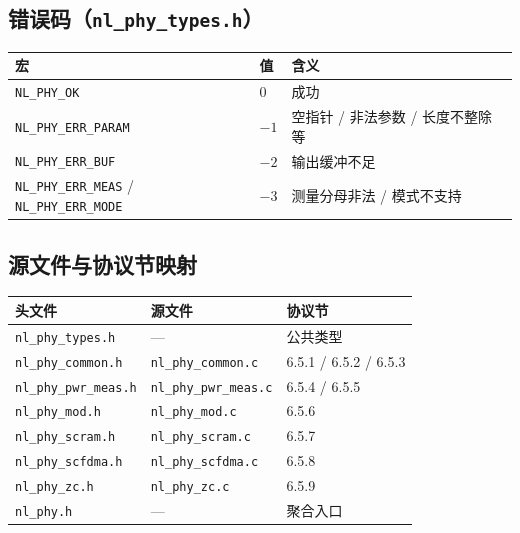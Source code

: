 \documentclass[11pt,a4paper]{ctexart}
\begin{document}
\subsection{错误码（\texttt{nl\_phy\_types.h}）}

\begin{table}[h]
\centering
\small
\begin{tabular}{lll}
\toprule
\textbf{宏} & \textbf{值} & \textbf{含义} \\
\midrule
\texttt{NL\_PHY\_OK} & 0 & 成功 \\
\texttt{NL\_PHY\_ERR\_PARAM} & $-1$ & 空指针 / 非法参数 / 长度不整除等 \\
\texttt{NL\_PHY\_ERR\_BUF} & $-2$ & 输出缓冲不足 \\
\texttt{NL\_PHY\_ERR\_MEAS} / \texttt{NL\_PHY\_ERR\_MODE} & $-3$ & 测量分母非法 / 模式不支持 \\
\bottomrule
\end{tabular}
\end{table}

\subsection{源文件与协议节映射}

\begin{table}[h]
\centering
\small
\begin{tabular}{lll}
\toprule
\textbf{头文件} & \textbf{源文件} & \textbf{协议节} \\
\midrule
\texttt{nl\_phy\_types.h} & --- & 公共类型 \\
\texttt{nl\_phy\_common.h} & \texttt{nl\_phy\_common.c} & 6.5.1 / 6.5.2 / 6.5.3 \\
\texttt{nl\_phy\_pwr\_meas.h} & \texttt{nl\_phy\_pwr\_meas.c} & 6.5.4 / 6.5.5 \\
\texttt{nl\_phy\_mod.h} & \texttt{nl\_phy\_mod.c} & 6.5.6 \\
\texttt{nl\_phy\_scram.h} & \texttt{nl\_phy\_scram.c} & 6.5.7 \\
\texttt{nl\_phy\_scfdma.h} & \texttt{nl\_phy\_scfdma.c} & 6.5.8 \\
\texttt{nl\_phy\_zc.h} & \texttt{nl\_phy\_zc.c} & 6.5.9 \\
\texttt{nl\_phy.h} & --- & 聚合入口 \\
\bottomrule
\end{tabular}
\end{table}

\newpage
\end{document}
